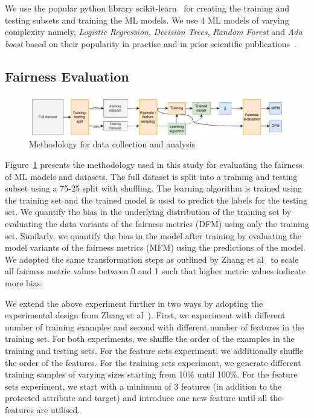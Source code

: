 \documentclass{article}
\begin{document}
We use the popular python library scikit-learn \cite{sklearn} for
creating the training and testing subsets and training the ML models.
We use 4 ML models of varying complexity namely, \emph{Logistic
Regression}, \emph{Decision Trees}, \emph{Random Forest} and \emph{Ada
boost} based on their popularity in practise and in prior scientific
publications \cite{CITEME}.

\subsection{Fairness Evaluation}\label{sec:method-fair-eval}

\begin{figure}
  \centering
  \includegraphics[width=0.95\linewidth]{method.pdf}
  \caption{Methodology for data collection and analysis}
  \label{fig:method}
\end{figure}

Figure \ref{fig:method} presents the methodology used in this study
for evaluating the fairness of ML models and datasets. The full
dataset is split into a training and testing subset using a 75-25
split with shuffling. The learning algorithm is trained using the
training set and the trained model is used to predict the labels for
the testing set. We quantify the bias in the underlying distribution
of the training set by evaluating the data variants of the fairness
metrics (DFM) using only the training set. Similarly, we quantify the
bias in the model after training by evaluating the model variants of
the fairness metrics (MFM) using the predictions of the model. We
adopted the same transformation steps as outlined by Zhang et
al \cite{zhang2021ignorance} to scale all fairness metric values
between 0 and 1 such that higher metric values indicate more bias.


We extend the above experiment further in two ways by adopting the
experimental design from Zhang et al \cite{zhang2021ignorance}).
First, we experiment with different number of training examples and
second with different number of features in the training set. For both
experiments, we shuffle the order of the examples in the training and
testing sets. For the feature sets experiment, we additionally shuffle
the order of the features. For the training sets experiment, we
generate different training samples of varying sizes starting from
10\% until 100\%. For the feature sets experiment, we start with a
minimum of 3 features (in addition to the protected attribute and
target) and introduce one new feature until all the features are
utilised.
\end{document}
